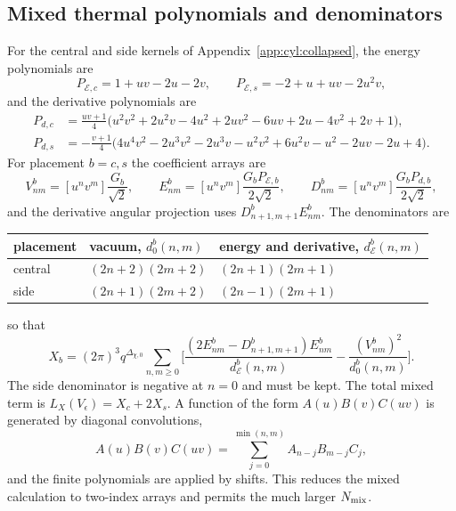 \documentclass[11pt,a4paper]{article}
\numberwithin{equation}{section}
\begin{document}
\subsection{Mixed thermal polynomials and denominators}\label{app:cyl:mixed}
For the central and side kernels of Appendix~\ref{app:cyl:collapsed}, the energy polynomials are
\begin{equation}
 P_{\mathcal E,c}=1+uv-2u-2v,\qquad P_{\mathcal E,s}=-2+u+uv-2u^2v,
\end{equation}
and the derivative polynomials are
\begin{equation}
\begin{aligned}
 P_{d,c}&=\frac{uv+1}{4}\bigl(u^2v^2+2u^2v-4u^2+2uv^2-6uv+2u-4v^2+2v+1\bigr),\\
 P_{d,s}&=-\frac{v+1}{4}\bigl(4u^4v^2-2u^3v^2-2u^3v-u^2v^2+6u^2v-u^2-2uv-2u+4\bigr).
\end{aligned}
\label{eq:cyl:mixedpolys}
\end{equation}
For placement $b=c,s$ the coefficient arrays are
\begin{equation}
 V^b_{nm}=[u^nv^m]\frac{G_b}{\sqrt2},\qquad E^b_{nm}=[u^nv^m]\frac{G_bP_{\mathcal E,b}}{2\sqrt2},\qquad
 D^b_{nm}=[u^nv^m]\frac{G_bP_{d,b}}{2\sqrt2},
\end{equation}
and the derivative angular projection uses $D^b_{n+1,m+1}E^b_{nm}$. The denominators are
\begin{center}\small
\begin{tabular}{@{}lll@{}}
\toprule
placement & vacuum, $d^b_0(n,m)$ & energy and derivative, $d^b_{\mathcal E}(n,m)$\\
\midrule
central & $(2n+2)(2m+2)$ & $(2n+1)(2m+1)$\\
side & $(2n+1)(2m+2)$ & $(2n-1)(2m+1)$\\
\bottomrule
\end{tabular}
\end{center}
so that
\begin{equation}
 X_b=(2\pi)^3q^{\Delta_{\chi,0}}\sum_{n,m\ge0}\biggl[\frac{(2E^b_{nm}-D^b_{n+1,m+1})E^b_{nm}}{d^b_{\mathcal E}(n,m)}
 -\frac{(V^b_{nm})^2}{d^b_0(n,m)}\biggr].
\end{equation}
The side denominator is negative at $n=0$ and must be kept. The total mixed term is $L_X(V_\epsilon)=X_c+2X_s$. A
function of the form $A(u)B(v)C(uv)$ is generated by diagonal convolutions,
\begin{equation}
 [u^nv^m]A(u)B(v)C(uv)=\sum_{j=0}^{\min(n,m)}A_{n-j}B_{m-j}C_j,
 \label{eq:cyl:diagconv}
\end{equation}
and the finite polynomials are applied by shifts. This reduces the mixed calculation to two-index arrays and permits
the much larger $N_{\rm mix}$.
\end{document}
